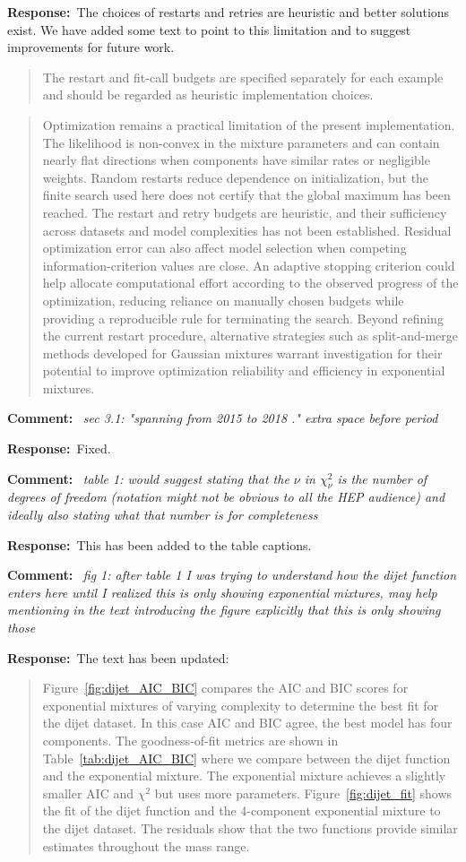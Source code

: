 \documentclass[11pt,a4paper]{article}
\newcommand{\refcomment}[1]{%
    \medskip\noindent\textbf{\color{refcolor}Comment:}\ %
    {\itshape #1}\par\smallskip
}
\newcommand{\response}{\noindent\textbf{Response:}\ }
\newcommand{\addedtext}[1]{%
    \smallskip\begin{quote}\color{quotecolor}\small #1\end{quote}\smallskip
}
\begin{document}
\response The choices of restarts and retries are heuristic and better solutions exist. We have added some text to point to this limitation and to suggest improvements for future work.
\addedtext{The restart and fit-call budgets are specified separately for each example and should be regarded as heuristic implementation choices.}
\addedtext{Optimization remains a practical limitation of the present implementation. The likelihood is non-convex in the mixture parameters and can contain nearly flat directions when components have similar rates or negligible weights. Random restarts reduce dependence on initialization, but the finite search used here does not certify that the global maximum has been reached. The restart and retry budgets are heuristic, and their sufficiency across datasets and model complexities has not been established. Residual optimization error can also affect model selection when competing information-criterion values are close. An adaptive stopping criterion could help allocate computational effort according to the observed progress of the optimization, reducing reliance on manually chosen budgets while providing a reproducible rule for terminating the search. Beyond refining the current restart procedure, alternative strategies such as split-and-merge methods developed for Gaussian mixtures \cite{split-and-merge} warrant investigation for their potential to improve optimization reliability and efficiency in exponential mixtures.}

\refcomment{sec 3.1: "spanning from 2015 to 2018 ." extra space before period}
\response Fixed.

\refcomment{table 1: would suggest stating that the $\nu$ in $\chi_\nu^2$ is the number of degrees
of freedom (notation might not be obvious to all the HEP audience) and ideally also stating what that number is for completeness}
\response This has been added to the table captions.

\refcomment{fig 1: after table 1 I was trying to understand how the dijet function
enters here until I realized this is only showing exponential mixtures,
may help mentioning in the text introducing the figure explicitly that
this is only showing those}
\response The text has been updated:
\addedtext{Figure~\ref{fig:dijet_AIC_BIC} compares the AIC and BIC scores for exponential mixtures of varying complexity to determine the best fit for the dijet dataset. In this case AIC and BIC agree, the best model has four components. The goodness-of-fit metrics are shown in Table~\ref{tab:dijet_AIC_BIC} where we compare between the dijet function and the exponential mixture. The exponential mixture achieves a slightly smaller AIC and $\chi^2$ but uses more parameters.
Figure~\ref{fig:dijet_fit} shows the fit of the dijet function and the 4-component exponential mixture to the dijet dataset.
The residuals show that the two functions provide similar estimates throughout the mass range.}
\end{document}
